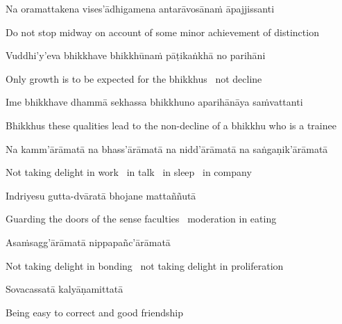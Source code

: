 Na oramattakena vises'ādhigamena antarāvosānaṁ āpajjissanti

\begin{english-hang}
  Do not stop midway on account of some minor achievement of distinction
\end{english-hang}

Vuddhi'y'eva bhikkhave bhikkhūnaṁ pāṭikaṅkhā no parihāni

\begin{english}
  Only growth is to be expected for the bhikkhus \breathmark\ not decline
\end{english}

\suttaRef{[AN 7.23-27]}

\ifninebythirteenversion\clearpage\fi

\begin{pali-hang}
  Ime bhikkhave dhammā sekhassa bhikkhuno aparihānāya saṁvattanti
\end{pali-hang}

\begin{english-hang}
  Bhikkhus these qualities lead to the non-decline of a bhikkhu who is a trainee
\end{english-hang}

\begin{pali-hang}
  Na kamm'ārāmatā na bhass'ārāmatā na nidd'ārāmatā na saṅgaṇik'ārāmatā
\end{pali-hang}

\begin{english}
  Not taking delight in work \breathmark\ in talk \breathmark\ in sleep \breathmark\ in company
\end{english}

Indriyesu gutta-dvāratā bhojane mattaññutā

\begin{english}
  Guarding the doors of the sense faculties \breathmark\ moderation in eating
\end{english}

Asaṁsagg'ārāmatā nippapañc'ārāmatā

\begin{english}
  Not taking delight in bonding \breathmark\ not taking delight in proliferation
\end{english}

Sovacassatā kalyāṇamittatā

\begin{english}
  Being easy to correct and good friendship
\end{english}

